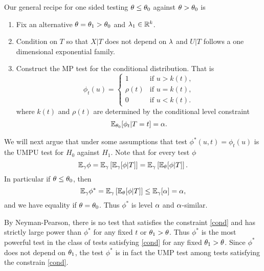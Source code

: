  Our general recipe for one sided testing ${\theta} \le {\theta}_0$ against ${\theta} > {\theta}_0$ is 
\renewcommand\labelenumi{(\theenumi)}
\begin{enumerate}
    \item Fix an alternative ${\theta} = {\theta}_1 > {\theta}_0$ and $\lambda_1 \in {\mathbb R}^k$.
    \item Condition on $T$ so that $X|T$ does not depend on $\lambda$ and $U|T$ follows a one dimensional exponential family. 
    \item Construct the MP test for the conditional distribution. That is
    \[\phi_t(u) = \begin{cases}
        1 & \text{if } u > k(t),\\
        \rho(t) & \text{if } u = k(t),\\
        0 & \text{if } u < k(t).
    \end{cases}\]
    where $k(t)$ and $\rho(t)$ are determined by the conditional level constraint
    \begin{align}\label{cond}
        {\mathbb{E}}_{{\theta}_0}[\phi_t | T=t] = {\alpha}.
    \end{align}
\end{enumerate}
We will next argue that under some assumptions that test $\phi^*(u,t) = \phi_t(u)$ is the UMPU test for $H_0$ against $H_1$. Note that for every test $\phi$
\[{\mathbb{E}}_{\gamma} \phi = {\mathbb{E}}_{\gamma}\left[{\mathbb{E}}_{\gamma}[\phi|T]\right] = {\mathbb{E}}_{\gamma}\left[{\mathbb{E}}_{{\theta}}[\phi|T]\right]. \]
In particular if ${\theta} \le {\theta}_0$, then 
\[{\mathbb{E}}_{\gamma} \phi^* = {\mathbb{E}}_{\gamma}\left[{\mathbb{E}}_{\theta}[\phi|T]\right]\le {\mathbb{E}}_{\gamma}[{\alpha}]={\alpha}, \]
and we have equality if ${\theta} = {\theta}_0$. Thus $\phi^*$ is level ${\alpha}$ and ${\alpha}$-similar.

By Neyman-Pearson, there is no test that satisfies the constraint \eqref{cond} and has strictly large power than $\phi^*$ for any fixed $t$ or ${\theta}_1 > {\theta}$. Thus $\phi^*$ is the most powerful test in the class of tests satisfying \eqref{cond} for any fixed ${\theta}_1 > {\theta}$. Since $\phi^*$ does not depend on ${\theta}_1$, the test $\phi^*$ is in fact the UMP test among tests satisfying the constrain \eqref{cond}.

